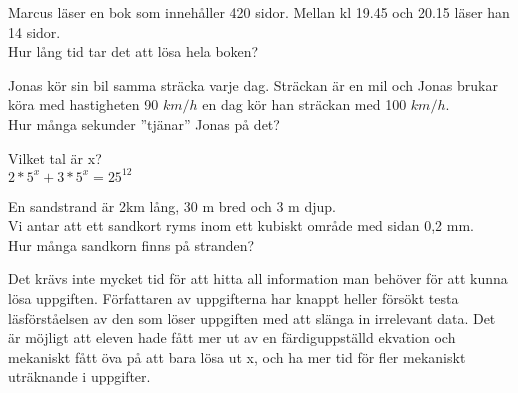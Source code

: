 

\begin{displayquote}
\textcolor{turkos}{Marcus läser en bok som innehåller 420 sidor. Mellan kl 19.45 och 20.15 läser han 14 sidor. \\
Hur lång tid tar det att lösa hela boken?}
\end{displayquote}


\begin{displayquote}
\textcolor{turkos}{Jonas kör sin bil samma sträcka varje dag. Sträckan är en mil och Jonas brukar köra med hastigheten 90 $km/h$ en dag kör han sträckan med 100 $km/h$. \\
Hur många sekunder ''tjänar'' Jonas på det?}
\end{displayquote}



\begin{displayquote}
\textcolor{turkos}{Vilket tal är x?\\
\( 2*5^x + 3*5^x = 25^{12} \)}
\end{displayquote}


\begin{displayquote}
\textcolor{turkos}{En sandstrand är 2km lång, 30 m bred och 3 m djup. \\
Vi antar att ett sandkort ryms inom ett kubiskt område med sidan 0,2 mm.\\
Hur många sandkorn finns på stranden?}
\end{displayquote}



\textcolor{WildStrawberry}{
    Det krävs inte mycket tid för att hitta all information man behöver för att kunna lösa uppgiften. Författaren av uppgifterna har knappt heller försökt testa läsförståelsen av den som löser uppgiften med att slänga in irrelevant data.  Det är möjligt att eleven hade fått mer ut av en färdiguppställd ekvation och mekaniskt fått öva på att bara lösa ut x, och ha mer tid för fler mekaniskt uträknande i uppgifter.}